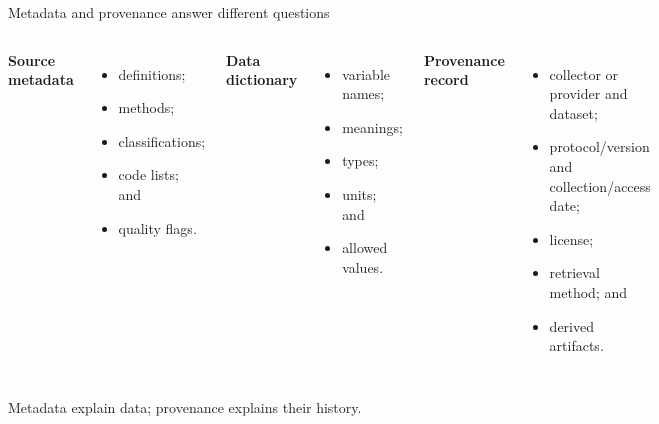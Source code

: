 \documentclass[10pt,aspectratio=169]{beamer}
\begin{document}
\begin{frame}{Metadata and provenance answer different questions}

\small

\begin{columns}[T]


\textbf{Source metadata}

\begin{itemize}
  \item definitions;
  \item methods;
  \item classifications;
  \item code lists; and
  \item quality flags.
\end{itemize}


\textbf{Data dictionary}

\begin{itemize}
  \item variable names;
  \item meanings;
  \item types;
  \item units; and
  \item allowed values.
\end{itemize}


\textbf{Provenance record}

\begin{itemize}
  \item collector or provider and dataset;
  \item protocol/version and collection/access date;
  \item license;
  \item retrieval method; and
  \item derived artifacts.
\end{itemize}

\end{columns}

\vspace{0.35cm}

\centering
\textcolor{ukudlaRed}{Metadata explain data; provenance explains their history.}

\end{frame}
\end{document}
